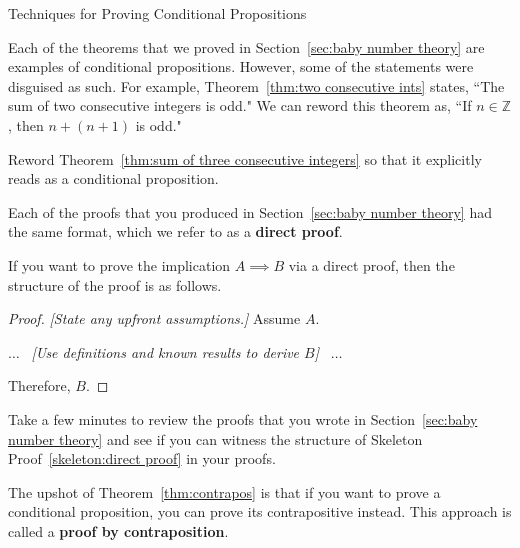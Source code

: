 \begin{section}{Techniques for Proving Conditional Propositions}

Each of the theorems that we proved in Section~\ref{sec:baby number theory} are examples of conditional propositions. However, some of the statements were disguised as such. For example, Theorem~\ref{thm:two consecutive ints} states, ``The sum of two consecutive integers is odd." We can reword this theorem as, ``If $n\in\mathbb{Z}$, then $n+(n+1)$ is odd."

\begin{problem}\label{prob:reword as conditional}
Reword Theorem~\ref{thm:sum of three consecutive integers} so that it explicitly reads as a conditional proposition.
\end{problem}

Each of the proofs that you produced in Section~\ref{sec:baby number theory} had the same format, which we refer to as a \textbf{direct proof}. 

\begin{skeleton}\label{skeleton:direct proof}

If you want to prove the implication $A\implies B$ via a direct proof, then the structure of the proof is as follows.

\begin{mdframed}[style=skeleton]
\begin{proof}
\emph{[State any upfront assumptions.]} Assume $A$.
\begin{center}
$\ldots$ \ \emph{[Use definitions and known results to derive $B$]} \ $\ldots$\\
\end{center}
\noindent Therefore, $B$.
\end{proof}
\end{mdframed}
\end{skeleton}

Take a few minutes to review the proofs that you wrote in Section~\ref{sec:baby number theory} and see if you can witness the structure of Skeleton Proof~\ref{skeleton:direct proof} in your proofs. 

The upshot of Theorem~\ref{thm:contrapos} is that if you want to prove a conditional proposition, you can prove its contrapositive instead. This approach is called a \textbf{proof by contraposition}.


\end{section}
